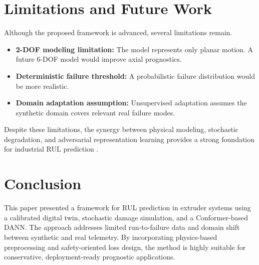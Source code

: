 \documentclass[journal,10pt,a4paper]{IEEEtran}
\begin{document}
\section{Limitations and Future Work}
Although the proposed framework is advanced, several limitations remain. 
\begin{itemize}[leftmargin=1.5em]
    \item \textbf{2-DOF modeling limitation:} The model represents only planar motion. A future 6-DOF model would improve axial prognostics.
    \item \textbf{Deterministic failure threshold:} A probabilistic failure distribution would be more realistic.
    \item \textbf{Domain adaptation assumption:} Unsupervised adaptation assumes the synthetic domain covers relevant real failure modes.
\end{itemize}

Despite these limitations, the synergy between physical modeling, stochastic degradation, and adversarial representation learning provides a strong foundation for industrial RUL prediction \cite{tao2018digitaltwin,ganin2016domain,dt_rul_mdpi}.

\section{Conclusion}
This paper presented a framework for RUL prediction in extruder systems using a calibrated digital twin, stochastic damage simulation, and a Conformer-based DANN. The approach addresses limited run-to-failure data and domain shift between synthetic and real telemetry. By incorporating physics-based preprocessing and safety-oriented loss design, the method is highly suitable for conservative, deployment-ready prognostic applications.
\end{document}
